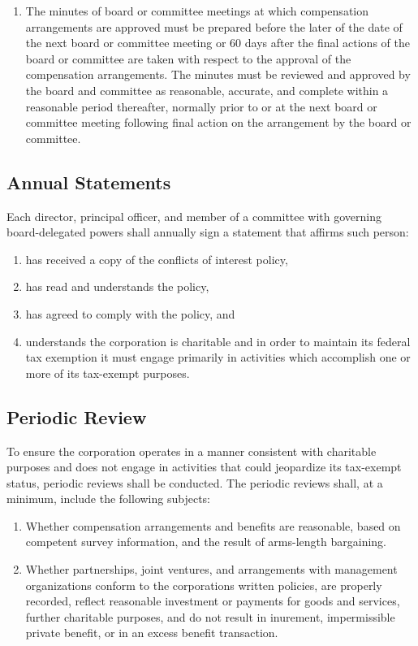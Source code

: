 \documentclass{article}
\begin{document}
\begin{enumerate}[\indent (a)]
\begin{enumerate}[\indent 1)]
			\item The minutes of board or committee meetings at which compensation arrangements are approved must be prepared before the later of the date of the next board or committee meeting or 60 days after the final actions of the board or committee are taken with respect to the approval of the compensation arrangements. The minutes must be reviewed and approved by the board and committee as reasonable, accurate, and complete within a reasonable period thereafter, normally prior to or at the next board or committee meeting following final action on the arrangement by the board or committee.
			\end{enumerate}
		\end{enumerate}
	\subsection{Annual Statements}
	Each director, principal officer, and member of a committee with governing board-delegated powers shall annually sign a statement that affirms such person:
	\begin{enumerate}[\indent (a)] 
		\item has received a copy of the conflicts of interest policy,
		\item has read and understands the policy,
		\item has agreed to comply with the policy, and
		\item understands the corporation is charitable and in order to maintain its federal tax exemption it must engage primarily in activities which accomplish one or more of its tax-exempt purposes.
	\end{enumerate}
	
	\subsection{Periodic Review}
	To ensure the corporation operates in a manner consistent with charitable purposes and does not engage in activities that could jeopardize its tax-exempt status, periodic reviews shall be conducted. The periodic reviews shall, at a minimum, include the following subjects:
	\begin{enumerate}[\indent (a)] 
		\item Whether compensation arrangements and benefits are reasonable, based on competent survey information, and the result of arm\textquotesingle s-length bargaining.
		\item Whether partnerships, joint ventures, and arrangements with management organizations conform to the corporation\textquotesingle s written policies, are properly recorded, reflect reasonable investment or payments for goods and services, further charitable purposes, and do not result in inurement, impermissible private benefit, or in an excess benefit transaction.
	\end{enumerate}
	
\end{document}
